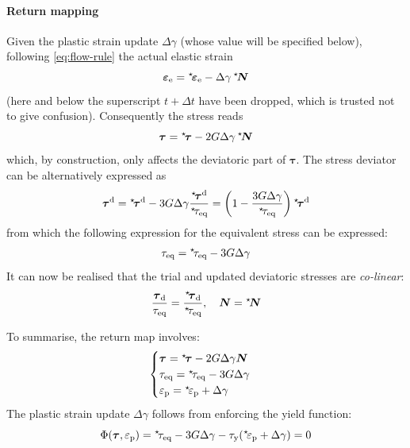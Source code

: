 \documentclass[namecite, fleqn]{goose-article}
\newcommand\ST[1]{\hspace*{-.3em}~^\star\!#1}
\newcommand\T[1]{\bm{{#1}}}
\begin{document}
\paragraph{Return mapping}

Given the plastic strain update $\Delta \gamma$ (whose value will be specified below),
following \cref{eq:flow-rule} the actual elastic strain
\begin{equation}
    \T{\varepsilon}_\mathrm{e} = \ST{\T{\varepsilon}}_\mathrm{e} - \Delta \gamma \,\ST{\T{N}}
\end{equation}
(here and below the superscript $t + \Delta t$ have been dropped,
which is trusted not to give confusion).
Consequently the stress reads
\begin{equation}
    \T{\tau} = \ST{\T{\tau}} - 2 G \Delta \gamma \, \ST{\T{N}}
\end{equation}
which, by construction, only affects the deviatoric part of $\T{\tau}$.
The stress deviator can be alternatively expressed as
\begin{equation}
    \T{\tau}^\mathrm{d}
    = \ST{\T{\tau}}^\mathrm{d}
    - 3 G \Delta \gamma \frac{\ST{\T{\tau}}^\mathrm{d}}{\ST{\tau}_\mathrm{eq}}
    = \left( 1 - \frac{3 G \Delta \gamma }{\ST{\tau}_\mathrm{eq}} \right) \ST{\T{\tau}}^\mathrm{d}
\end{equation}
from which the following expression for the equivalent stress can be expressed:
\begin{equation}
    \tau_\mathrm{eq} = \ST{\tau}_\mathrm{eq} - 3 G \Delta \gamma
\end{equation}
It can now be realised that the trial and updated deviatoric stresses are \emph{co-linear}:
\begin{equation}
    \frac{ \T{\tau}_\mathrm{d} }{ \tau_\mathrm{eq} }
    =
    \frac{ \ST{\T{\tau}}_\mathrm{d} }{ \ST{\tau}_\mathrm{eq} }, \quad
    \T{N} = \ST{\T{N}}
\end{equation}

To summarise, the return map involves:
\begin{equation}
    \begin{cases}
        \T{\tau} = \ST{\T{\tau}} - 2 G \Delta \gamma \T{N}
        \\
        \tau_\mathrm{eq} = \ST{\tau}_\mathrm{eq} - 3 G \Delta \gamma
        \\
        \varepsilon_\mathrm{p} = \ST{\varepsilon}_\mathrm{p} + \Delta \gamma
    \end{cases}
\end{equation}
The plastic strain update $\Delta \gamma$ follows from enforcing the yield function:
\begin{equation}
    \Phi(\T{\tau}, \varepsilon_\mathrm{p})
    = \ST{\tau}_\mathrm{eq}
    - 3 G \Delta \gamma - \tau_\mathrm{y} ( \ST{\varepsilon}_\mathrm{p} + \Delta \gamma ) = 0
    \label{eq:return-map:yield-function}
\end{equation}
\end{document}
